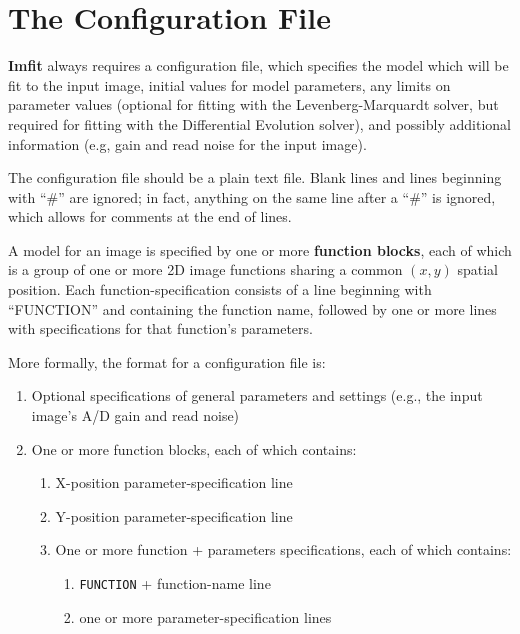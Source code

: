 \documentclass[10pt,a4paper,article]{memoir}
\newcommand{\Imfit}{\textbf{Imfit}}
\begin{document}
\newpage

\chapter{The Configuration File}\label{sec:configfile}

\Imfit{} always requires a configuration file, which specifies the model
which will be fit to the input image, initial values for model parameters, any
limits on parameter values (optional for fitting with the Levenberg-Marquardt
solver, but required for fitting with the Differential Evolution solver), and
possibly additional information (e.g, gain and read noise for the input image).

The configuration file should be a plain text file. Blank lines and
lines beginning with ``\#'' are ignored; in fact, anything on the same line after a
``\#'' is ignored, which allows for comments at the end of lines.

A model for an image is specified by one or more \textbf{function blocks}, each of
which is a group of one or more 2D image functions sharing a common $(x,y)$
spatial position. Each function-specification consists of a line beginning with
``FUNCTION'' and containing the function name, followed by one or more lines
with specifications for that function's parameters.

\bigskip

More formally, the format for a configuration file is:
\begin{enumerate}
\item Optional specifications of general parameters and settings (e.g., the
input image's A/D gain and read noise)
\item One or more function blocks, each of which contains:
\begin{enumerate}
\item X-position parameter-specification line
\item Y-position parameter-specification line
\item One or more function + parameters specifications, each of which contains:
\begin{enumerate}
\item \texttt{FUNCTION} + function-name line
\item one or more parameter-specification lines
\end{enumerate}
\end{enumerate}
\end{enumerate}
\end{document}
